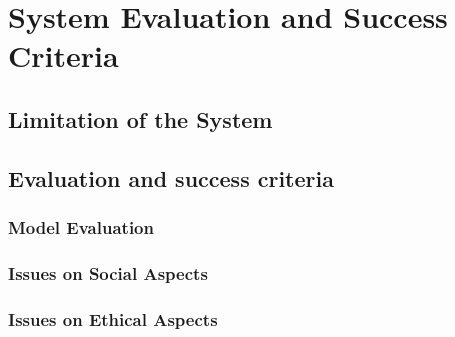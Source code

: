 
\section{System Evaluation and Success Criteria}

\subsection{Limitation of the System}
\subsection{Evaluation and success criteria}
  \subsubsection{Model Evaluation}
  \subsubsection{Issues on Social Aspects}
  \subsubsection{Issues on Ethical Aspects}